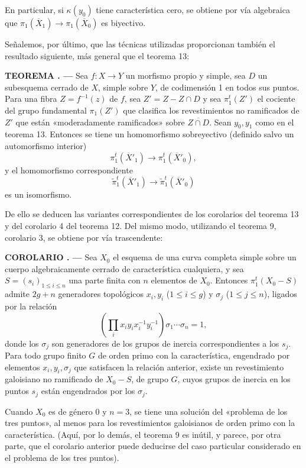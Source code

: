 \documentclass[11pt,twoside,openany]{book}
\numberwithin{equation}{section}
\theoremstyle{plain}
\theoremstyle{definition}
\theoremstyle{remark}
\newcommand{\result}[2]{%
  \par\medskip\noindent\textbf{#1%
  \if\relax\detokenize{#2}\relax\else\space#2\fi. ---}\enspace
}
\theoremstyle{plain}
\theoremstyle{definition}
\theoremstyle{remark}
\begin{document}
En particular, si $\kappa(y_0)$ tiene característica cero, se obtiene por vía
algebraica que $\pi_1(\overline X_1)\longrightarrow\pi_1(\overline X_0)$ es
biyectivo.

Señalemos, por último, que las técnicas utilizadas proporcionan también el
resultado siguiente, más general que el teorema 13:

\result{TEOREMA}{14} Sea $f:X\longrightarrow Y$ un morfismo propio y simple,
sea $D$ un subesquema cerrado de $X$, simple sobre $Y$, de codimensión 1 en
todos sus puntos. Para una fibra $Z=f^{-1}(z)$ de $f$, sea $Z'=Z-Z\cap D$ y sea
$\pi_1^t(Z')$ el cociente del grupo fundamental $\pi_1(Z')$ que clasifica los
revestimientos no ramificados de $Z'$ que están «moderadamente ramificados»
sobre $\overline{Z\cap D}$. Sean $y_0,y_1$ como en el teorema 13. Entonces se
tiene un homomorfismo sobreyectivo (definido salvo un automorfismo interior)
\[
  \pi_1^t(\overline X'_1)\longrightarrow\pi_1^t(\overline X'_0),
\]
y el homomorfismo correspondiente
\[
  \widetilde\pi_1^t(\overline X'_1)
  \longrightarrow\widetilde\pi_1^t(\overline X'_0)
\]
es un isomorfismo.

De ello se deducen las variantes correspondientes de los corolarios del
teorema 13 y del corolario 4 del teorema 12. Del mismo modo, utilizando el
teorema 9, corolario 3, se obtiene por vía trascendente:

\result{COROLARIO}{} Sea $X_0$ el esquema de una curva completa simple sobre un
cuerpo algebraicamente cerrado de característica cualquiera, y sea
$S=(s_i)_{1\le i\le n}$ una parte finita con $n$ elementos de $X_0$. Entonces
$\pi_1^t(X_0-S)$ admite $2g+n$ generadores topológicos
$x_i,y_i$ ($1\le i\le g$) y $\sigma_j$ ($1\le j\le n$), ligados por la relación
\[
  \left(\prod_i x_i y_i x_i^{-1}y_i^{-1}\right)
  \sigma_1\cdots\sigma_n=1,
\]
donde los $\sigma_j$ son generadores de los grupos de inercia correspondientes
a los $s_j$. Para todo grupo finito $G$ de orden primo con la característica,
engendrado por elementos $x_i,y_i,\sigma_j$ que satisfacen la relación anterior,
existe un revestimiento galoisiano no ramificado de $X_0-S$, de grupo $G$, cuyos
grupos de inercia en los puntos $s_j$ están engendrados por los $\sigma_j$.

Cuando $X_0$ es de género 0 y $n=3$, se tiene una solución del «problema de los
tres puntos», al menos para los revestimientos galoisianos de orden primo con
la característica. (Aquí, por lo demás, el teorema 9 es inútil, y parece, por
otra parte, que el corolario anterior puede deducirse del caso particular
considerado en el problema de los tres puntos).
\end{document}
